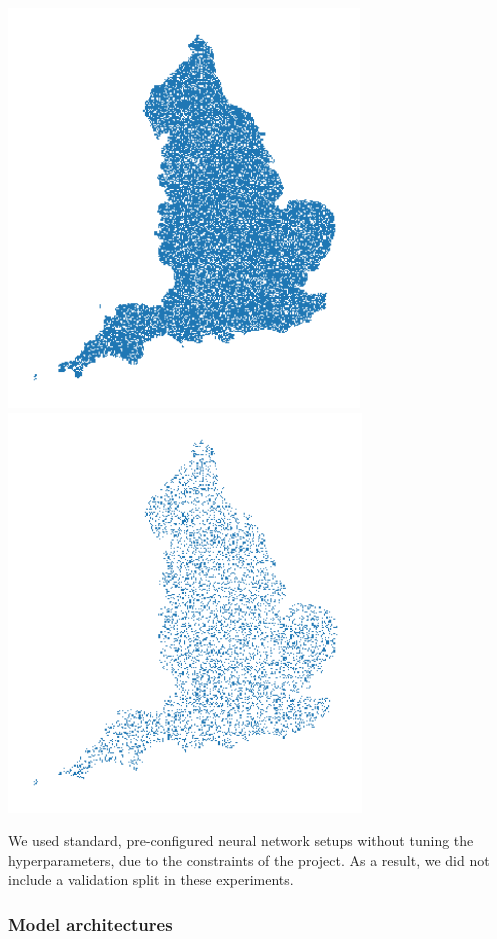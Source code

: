 \documentclass[
  letterpaper,
  DIV=11,
  numbers=noendperiod]{scrartcl}
\begin{document}
\includegraphics[width=\linewidth,height=4.16667in,keepaspectratio]{../figures/algo_design/train_df.png}\hfill
\hfill
\includegraphics[width=\linewidth,height=4.16667in,keepaspectratio]{../figures/algo_design/test_df.png}

We used standard, pre-configured neural network setups without tuning
the hyperparameters, due to the constraints of the project. As a result,
we did not include a validation split in these experiments.

\subsubsection{Model architectures}\label{model-architectures}
\end{document}
